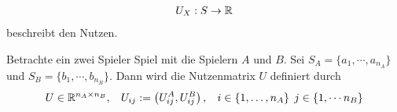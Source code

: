 \begin{defi}[Auszahlungsfunktion]
	\begin{align*}
		U_X: S \rightarrow \mathbb{R}
	\end{align*}
	beschreibt den Nutzen. 
\end{defi}

\begin{defi}[Nutzenmatrix]
	Betrachte ein zwei Spieler Spiel mit die Spielern $A$ und $B$. Sei $S_A=\{a_1, \cdots, a_{n_A}\}$ und $S_B=\{b_1, \cdots, b_{n_B}\}$. Dann wird die Nutzenmatrix $U$ definiert durch
	\begin{align*}
		U \in \mathbb{R}^{n_A \times n_B}, \hspace{2ex} U_{ij}:=\left( U_{ij}^A, U_{ij}^B \right), \hspace{2ex} i \in \{ 1,\dots, n_A \} \hspace{1ex} j \in \{ 1, \cdots n_B\}
	\end{align*} 
	
\end{defi}



















